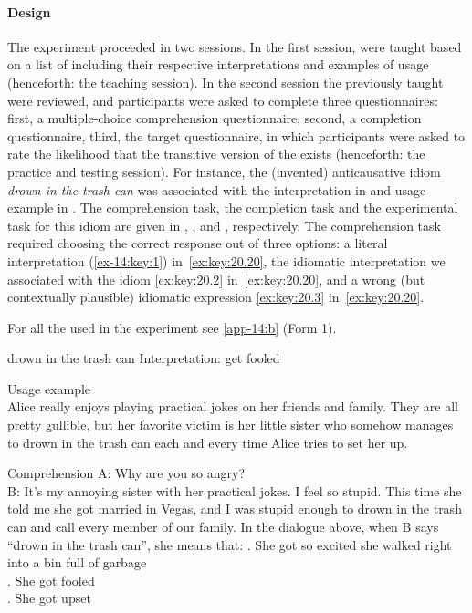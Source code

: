 \documentclass[output=paper]{langsci/langscibook}
\begin{document}
\paragraph*{Design} The experiment proceeded in two sessions. In the first
session,  were taught based on a list of  including their
respective interpretations and examples of usage (henceforth: the teaching
session). In the second session the  previously taught were reviewed, and
participants were asked to complete three questionnaires: first, a multiple-choice
comprehension questionnaire, second, a completion questionnaire, third, the
target questionnaire, in which participants were asked to rate the likelihood
that the transitive version of the  exists (henceforth: the practice and
testing session). For instance, the (invented) anticausative idiom \emph{drown
in the trash can}  was associated with the interpretation in
 and usage example in .  The comprehension
task, the completion task and the experimental task for this idiom are
given in , , and ,
respectively. The comprehension task required choosing the correct response out
of three options: a literal interpretation (\ref{ex-14:key:1}) in~\eqref{ex:key:20.20}, the
idiomatic interpretation we associated with the idiom
\eqref{ex:key:20.2}
in~\eqref{ex:key:20.20}, and a wrong (but contextually plausible) idiomatic
expression \eqref{ex:key:20.3} in~\eqref{ex:key:20.20}.

For all the  used in the experiment see \ref{app-14:b} (Form 1).

\ea\label{ex:key:20.18}
    \ea\label{ex:key:20.18a} drown in the trash can
    \ex\label{ex:key:20.18b} Interpretation: get fooled
    \z
\z

\ea\label{ex:key:20.19}Usage example\\
    Alice really enjoys playing practical jokes on her friends and family. They
    are all pretty gullible, but her favorite victim is her little sister who
    somehow manages to drown in the trash can each and every time Alice tries
    to set her up.
\z

\ea\label{ex:key:20.20}Comprehension
    \sn A: Why are you so angry?\\
        B: It's my annoying sister with her practical jokes.  I feel so stupid.
        This time she told me she got married in Vegas, and I was stupid enough
        to drown in the trash can and call every member of our family.
    \sn In the dialogue above, when B says \enquote{drown in the trash
        can}, she means that:
    . She got so excited she walked right into a bin full of garbage\\
    . She got fooled\\
    . She got upset
\z
\end{document}
